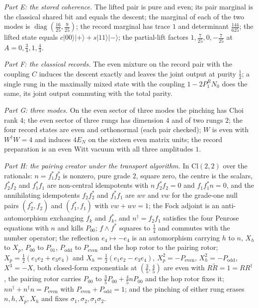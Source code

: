 \documentclass[11pt]{article}
\theoremstyle{definition}
\theoremstyle{plain}
\providecommand{\Cl}{}\renewcommand{\Cl}{\mathrm{Cl}}
\providecommand{\EN}{}\renewcommand{\EN}{E_{N}}
\providecommand{\ket}{}\renewcommand{\ket}[1]{|#1\rangle}
\begin{document}
\emph{Part E: the stored coherence.} The lifted pair is pure and even; its pair marginal is the classical shared bit and equals the descent; the marginal of each of the two modes is $\operatorname{diag}(\tfrac{16}{25}, \tfrac{9}{25})$; the record marginal has trace $1$ and determinant $\tfrac{144}{625}$; the lifted state equals $c\ket{00}\ket{+} + s\ket{11}\ket{-}$; the partial-lift factors $1, \tfrac{7}{25}, 0, -\tfrac{7}{25}$ at $A = 0, \tfrac34, 1, \tfrac43$.

\emph{Part F: the classical records.} The even mixture on the record pair with the coupling $C$ induces the descent exactly and leaves the joint output at purity $\tfrac12$; a single rung in the maximally mixed state with the coupling $1 - 2P^{R}_{1}N_{0}$ does the same, its joint output commuting with the total parity.

\emph{Part G: three modes.} On the even sector of three modes the pinching has Choi rank $4$; the even sector of three rungs has dimension $4$ and of two rungs $2$; the four record states are even and orthonormal (each pair checked); $W$ is even with $W^{\dagger}W = 4$ and induces $4\EN$ on the sixteen even matrix units; the record preparation is an even Witt vacuum with all three amplitudes $1$.

\emph{Part H: the pairing creator under the transport algorithm.} In $\Cl(2,2)$ over the rationals: $n = f_{1}^{*}f_{2}^{*}$ is nonzero, pure grade $2$, square zero, the centre is the scalars, $f_{2}^{*}f_{2}$ and $f_{1}^{*}f_{1}$ are non-central idempotents with $n\,f_{2}^{*}f_{2} = 0$ and $f_{1}f_{1}^{*}n = 0$, and the annihilating idempotents $f_{2}f_{2}^{*}$ and $f_{1}^{*}f_{1}$ are $wv$ and $vw$ for the grade-one null pairs $(f_{2}^{*}, f_{2})$ and $(f_{1}^{*}, f_{1})$ with $vw + wv = 1$; the Fock adjoint is an anti-automorphism exchanging $f_{k}$ and $f_{k}^{*}$, and $n^{\dagger} = f_{2}f_{1}$ satisfies the four Penrose equations with $n$ and kills $P_{00}$; $f \wedge f^{*}$ squares to $\tfrac14$ and commutes with the number operator; the reflection $e_{4} \mapsto -e_{4}$ is an automorphism carrying $h$ to $n$, $X_{h}$ to $X_{p}$, $P_{00}$ to $P_{01}$, $P_{\mathrm{odd}}$ to $P_{\mathrm{even}}$ and the hop rotor to the pairing rotor; $X_{p} = \tfrac12(e_{1}e_{2} + e_{3}e_{4})$ and $X_{h} = \tfrac12(e_{1}e_{2} - e_{3}e_{4})$, $X_{p}^{2} = -P_{\mathrm{even}}$, $X_{h}^{2} = -P_{\mathrm{odd}}$, $X^{3} = -X$, both closed-form exponentials at $(\tfrac35, \tfrac45)$ are even with $R\widetilde{R} = 1 = RR^{\dagger}$, the pairing rotor carries $P_{00}$ to $\tfrac35P_{00} + \tfrac45 nP_{00}$ and the hop rotor fixes it; $nn^{\dagger} + n^{\dagger}n = P_{\mathrm{even}}$ with $P_{\mathrm{even}} + P_{\mathrm{odd}} = 1$; and the pinching of either rung erases $n, h, X_{p}, X_{h}$ and fixes $\sigma_{1}, \sigma_{2}, \sigma_{1}\sigma_{2}$.
\end{document}
